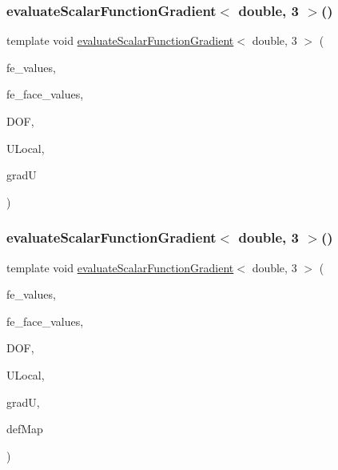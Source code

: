 \mbox{\label{function_evaluations_8cc_a0a5f51dad78d15ef40ed772bb4eeea4c}} 
\subsubsection{\texorpdfstring{evaluate\+Scalar\+Function\+Gradient$<$ double, 3 $>$()}{evaluateScalarFunctionGradient< double, 3 >()}\hspace{0.1cm}{\footnotesize\ttfamily [3/4]}}
{\footnotesize\ttfamily template void \mbox{\hyperlink{group___evaluation_functions_gabedd4ae2841d2332ed0df0513b189e34}{evaluate\+Scalar\+Function\+Gradient}}$<$ double, 3 $>$ (\begin{DoxyParamCaption}\item[{const F\+E\+Values$<$ 3 $>$ \&}]{fe\+\_\+values,  }\item[{const F\+E\+Face\+Values$<$ 3 $>$ \&}]{fe\+\_\+face\+\_\+values,  }\item[{unsigned int}]{D\+OF,  }\item[{Table$<$ 1, double $>$ \&}]{U\+Local,  }\item[{Table$<$ 2, double $>$ \&}]{gradU }\end{DoxyParamCaption})}

\mbox{\label{function_evaluations_8cc_a121295365acb762462c0f9812a5fc118}} 
\subsubsection{\texorpdfstring{evaluate\+Scalar\+Function\+Gradient$<$ double, 3 $>$()}{evaluateScalarFunctionGradient< double, 3 >()}\hspace{0.1cm}{\footnotesize\ttfamily [4/4]}}
{\footnotesize\ttfamily template void \mbox{\hyperlink{group___evaluation_functions_gabedd4ae2841d2332ed0df0513b189e34}{evaluate\+Scalar\+Function\+Gradient}}$<$ double, 3 $>$ (\begin{DoxyParamCaption}\item[{const F\+E\+Values$<$ 3 $>$ \&}]{fe\+\_\+values,  }\item[{const F\+E\+Face\+Values$<$ 3 $>$ \&}]{fe\+\_\+face\+\_\+values,  }\item[{unsigned int}]{D\+OF,  }\item[{Table$<$ 1, double $>$ \&}]{U\+Local,  }\item[{Table$<$ 2, double $>$ \&}]{gradU,  }\item[{\mbox{\hyperlink{structdeformation_map}{deformation\+Map}}$<$ double, 3 $>$ \&}]{def\+Map }\end{DoxyParamCaption})}

